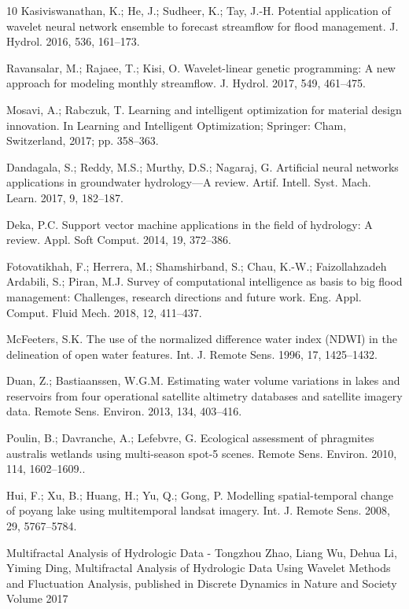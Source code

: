 \documentclass[12pt, a4paper]{report}
\begin{document}
\begin{thebibliography} {10}
Kasiviswanathan, K.; He, J.; Sudheer, K.; Tay, J.-H. Potential application of wavelet neural network ensemble to forecast streamflow for flood management. J. Hydrol. 2016, 536, 161–173.

Ravansalar, M.; Rajaee, T.; Kisi, O. Wavelet-linear genetic programming: A new approach for modeling monthly streamflow. J. Hydrol. 2017, 549, 461–475.

Mosavi, A.; Rabczuk, T. Learning and intelligent optimization for material design innovation. In Learning and Intelligent Optimization; Springer: Cham, Switzerland, 2017; pp. 358–363.

Dandagala, S.; Reddy, M.S.; Murthy, D.S.; Nagaraj, G. Artificial neural networks applications in groundwater hydrology—A review. Artif. Intell. Syst. Mach. Learn. 2017, 9, 182–187.

Deka, P.C. Support vector machine applications in the field of hydrology: A review. Appl. Soft Comput. 2014,
19, 372–386.

Fotovatikhah, F.; Herrera, M.; Shamshirband, S.; Chau, K.-W.; Faizollahzadeh Ardabili, S.; Piran, M.J. Survey of computational intelligence as basis to big flood management: Challenges, research directions and future work. Eng. Appl. Comput. Fluid Mech. 2018, 12, 411–437. 

McFeeters, S.K. The use of the normalized difference water index (NDWI) in the delineation of open water features. Int. J. Remote Sens. 1996, 17, 1425–1432.

Duan, Z.; Bastiaanssen, W.G.M. Estimating water volume variations in lakes and reservoirs from four operational satellite altimetry databases and satellite imagery data. Remote Sens. Environ. 2013, 134, 403–416.

Poulin, B.; Davranche, A.; Lefebvre, G. Ecological assessment of phragmites australis wetlands using multi-season spot-5 scenes. Remote Sens. Environ. 2010, 114, 1602–1609..

Hui, F.; Xu, B.; Huang, H.; Yu, Q.; Gong, P. Modelling spatial-temporal change of poyang lake using multitemporal landsat imagery. Int. J. Remote Sens. 2008, 29, 5767–5784.

Multifractal Analysis of Hydrologic Data -
Tongzhou Zhao, Liang Wu, Dehua Li, Yiming Ding, Multifractal Analysis of Hydrologic Data Using Wavelet Methods and Fluctuation Analysis, published in Discrete Dynamics in Nature and Society
Volume 2017


\end{thebibliography}
\end{document}
